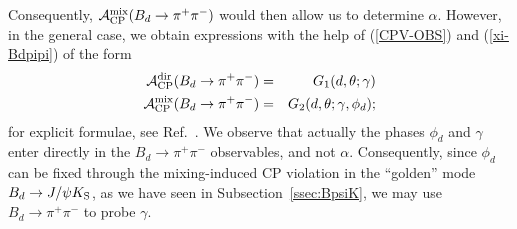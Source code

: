 \documentclass[11pt]{cernrep}
\begin{document}
Consequently, ${\cal A}_{\rm CP}^{\rm mix}(B_d\to\pi^+\pi^-)$ would then
allow us to determine $\alpha$. However, in the general case, we obtain 
expressions with the help of (\ref{CPV-OBS}) and (\ref{xi-Bdpipi}) of the form
\begin{eqnarray}
{\cal A}_{\rm CP}^{\rm dir}(B_d\to \pi^+\pi^-)&=&
G_1(d,\theta;\gamma) \label{CP-Bpipi-dir-gen}\\
{\cal A}_{\rm CP}^{\rm mix}(B_d\to \pi^+\pi^-)&=&
G_2(d,\theta;\gamma,\phi_d);\label{CP-Bpipi-mix-gen}
\end{eqnarray}
for explicit formulae, see Ref.~\cite{RF-BsKK}. We observe that actually the 
phases $\phi_d$ and $\gamma$ enter directly in the $B_d\to\pi^+\pi^-$ 
observables, and not $\alpha$. Consequently, since $\phi_d$ can be fixed 
through the mixing-induced CP violation in the ``golden'' mode 
$B_d\to J/\psi K_{\rm S}$, as we have seen in Subsection~\ref{ssec:BpsiK},
we may use $B_d\to\pi^+\pi^-$ to probe $\gamma$. 
\end{document}
